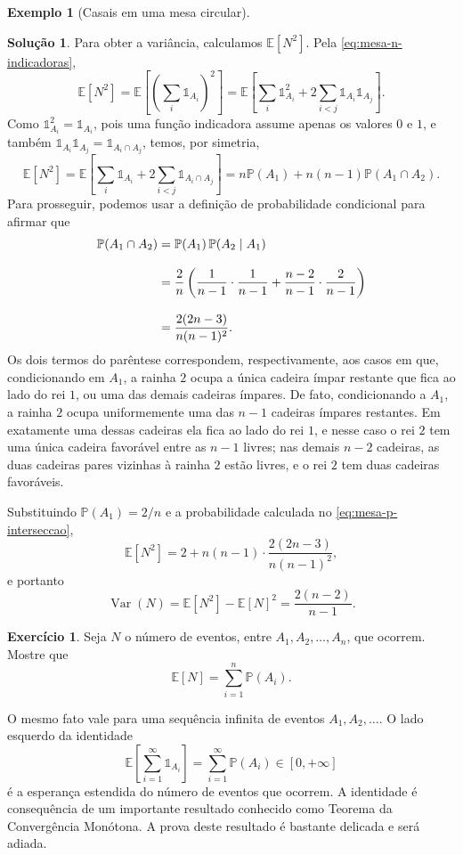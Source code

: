 \documentclass[12pt,portuguese]{article}
\theoremstyle{definition}
\newtheorem{example}[example]{Exemplo}
\newtheorem{exercise}{Exercício}
\newtheorem*{solution}{Solução}
\begin{document}
\begin{example}[Casais em uma mesa circular]
\begin{solution}
Para obter a variância, calculamos $\mathbb{E}[N^2]$. Pela
\eqref{eq:mesa-n-indicadoras},
\[
\mathbb{E}[N^2]
= \mathbb{E}\left[ \left( \sum_i \mathds{1}_{A_i} \right)^2 \right]
= \mathbb{E}\left[ \sum_i \mathds{1}_{A_i}^2
+ 2 \sum_{i<j} \mathds{1}_{A_i} \mathds{1}_{A_j} \right].
\]
Como $\mathds{1}_{A_i}^2 = \mathds{1}_{A_i}$, pois uma função indicadora
assume apenas os valores $0$ e $1$, e também
$\mathds{1}_{A_i} \mathds{1}_{A_j} = \mathds{1}_{A_i \cap A_j}$, temos,
por simetria,
\[
\mathbb{E}[N^2]
= \mathbb{E}\left[ \sum_i \mathds{1}_{A_i}
+ 2 \sum_{i<j} \mathds{1}_{A_i \cap A_j} \right]
= n \mathbb{P}(A_1) + n(n-1) \mathbb{P}(A_1 \cap A_2).
\]
Para prosseguir, podemos usar a definição de probabilidade condicional para afirmar que
\begin{align}
\mathbb{P}(A_1 \cap A_2)
&= \mathbb{P}(A_1) \, \mathbb{P}(A_2 \mid A_1) \notag 
\\[0.3cm]
&= \frac{2}{n} \left( \frac{1}{n-1} \cdot \frac{1}{n-1}
+ \frac{n-2}{n-1} \cdot \frac{2}{n-1} \right) 
\notag \\[0.3cm]
&= \frac{2(2n-3)}{n(n-1)^2} \label{eq:mesa-p-interseccao}.
\end{align}
Os dois termos do parêntese correspondem, respectivamente, aos casos em
que, condicionando em $A_1$, a rainha $2$ ocupa a única cadeira ímpar restante
que fica ao lado do rei $1$, ou uma das demais cadeiras ímpares. De fato,
condicionando a $A_1$, a rainha $2$ ocupa uniformemente uma das $n-1$
cadeiras ímpares restantes. Em exatamente uma dessas cadeiras ela fica
ao lado do rei $1$, e nesse caso o rei $2$ tem uma única cadeira
favorável entre as $n-1$ livres; nas demais $n-2$ cadeiras, as duas
cadeiras pares vizinhas à rainha $2$ estão livres, e o rei $2$ tem duas
cadeiras favoráveis.

Substituindo $\mathbb{P}(A_1) = 2/n$ e a probabilidade calculada no
\eqref{eq:mesa-p-interseccao},
\[
\mathbb{E}[N^2] = 2 + n(n-1) \cdot \frac{2(2n-3)}{n(n-1)^2},
\]
e portanto
\[
\operatorname{Var}(N) = \mathbb{E}[N^2] - \mathbb{E}[N]^2
= \frac{2(n-2)}{n-1}.
\]
\end{solution}
\end{example}

\begin{exercise}\label{exercise:numero-eventos}
Seja $N$ o número de eventos, entre $A_1, A_2, \ldots, A_n$, que ocorrem.
Mostre que
\[
\mathbb{E}[N] = \sum_{i=1}^{n} \mathbb{P}(A_i).
\]
\end{exercise}

O mesmo fato vale para uma sequência infinita de eventos $A_1, A_2,
\ldots$. O lado esquerdo da identidade
\[
\mathbb{E}\left[\sum_{i=1}^{\infty}\mathds{1}_{A_i}\right]
= \sum_{i=1}^{\infty}\mathbb{P}(A_i)\in[0,+\infty]
\]
é a esperança estendida do número de eventos que ocorrem. 
A identidade é consequência de um importante resultado
conhecido como Teorema da Convergência Monótona. A prova deste resultado é bastante delicada
e será adiada.
\end{document}
